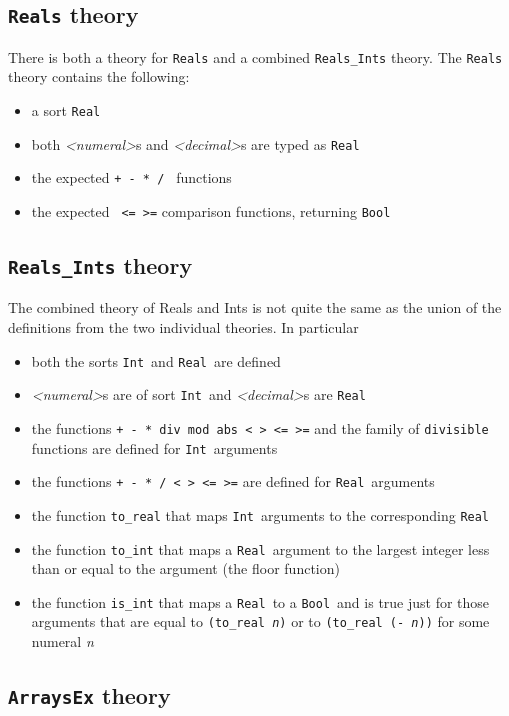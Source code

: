 \documentclass[12pt,oneside]{report}
\newcommand{\numeral}{{\it <numeral>}}
\newcommand{\decimal}{{\it <decimal>}}
\newcommand{\Bool}{{\tt Bool}}
\newcommand{\Int}{{\tt Int}}
\newcommand{\Real}{{\tt Real}}
\newcommand{\nospace}{\setlength{\itemsep}{0in}\setlength{\parsep}{0in}\setlength{\parskip}{0in}\setlength{\topsep}{0in}}
\begin{document}
\subsection{{\tt Reals} theory}

There is both a theory for {\tt Reals} and a combined {\tt Reals\_Ints} theory.  The {\tt Reals} theory contains the following:
\begin{itemize} \nospace
\item a sort \Real
\item both \numeral s and \decimal s are typed as \Real
\item the expected {\tt + - * / } functions
\item the expected {\tt < > <= >=} comparison functions, returning \Bool
\end{itemize}

\subsection{{\tt Reals\_Ints} theory}
 The combined theory of Reals and Ints is not quite the same as the union of the definitions from the two individual theories. In particular
 \begin{itemize} \nospace
 \item both the sorts \Int~and \Real~are defined
 \item \numeral s are of sort \Int~and \decimal s are \Real
 \item the functions {\tt + - * div mod abs < > <= >=} and the family of {\tt divisible} functions are defined for \Int~arguments
 \item the functions {\tt + - * / < > <= >=} are defined for \Real~arguments
 \item the function {\tt to\_real} that maps \Int~arguments to the corresponding \Real
 \item the function {\tt to\_int} that maps a \Real~argument to the largest integer less than or equal to the argument (the floor function)
 \item the function {\tt is\_int} that maps a \Real~to a \Bool~and is true just for those arguments that are equal to {\tt (to\_real {\it n})} or
 to {\tt (to\_real (- {\it n}))} for some numeral {\it n}
 \end{itemize}
 
 \subsection{{\tt ArraysEx} theory}
 
\end{document}
